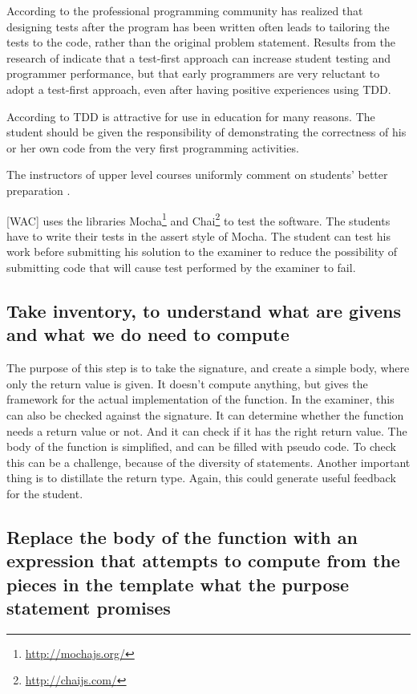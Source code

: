 According to \citep{proulx_test-driven_2009} the professional programming community has realized that designing tests after the program has been written often leads to tailoring the tests to the \gls{code}, rather than the original problem statement.
Results from the research of \citep{janzen_test-driven_2008} indicate that a test-first approach can
increase \gls{student} testing and programmer performance, but that early programmers are very reluctant to
adopt a test-first approach, even after having positive experiences using TDD.

According to \citep{edwards_rethinking_2003} TDD is attractive for use in education for many reasons.
The \gls{student} should be given the responsibility of demonstrating
the correctness of his or her own \gls{code} from the very first programming activities.

The instructors of upper level courses uniformly comment on students' better preparation \citep{proulx_test-driven_2009}.


[WAC] uses the libraries Mocha\footnote{\url{http://mochajs.org/}} and
Chai\footnote{\url{http://chaijs.com/}} to test the software.
The students have to write their tests in the assert style of Mocha. 
The \gls{student} can test his work before submitting his \gls{solution} to the
\gls{examiner} to reduce the possibility of submitting \gls{code} that will cause
test performed by the \gls{examiner} to fail.



\subsection{Take inventory, to understand what are givens and what we do need to compute}

The purpose of this step is to take the signature, and create a simple body,
where only the return value is given.
It doesn't compute anything, but gives the framework for the actual
implementation of the function.
In the \gls{examiner}, this can also be checked against the signature. It
can determine whether the function needs a return value or not. And it can check
if it has the right return value. The body of the function is simplified, and
can be filled with pseudo \gls{code}.
To check this can be a challenge, because of the diversity of statements. Another
important thing is to distillate the return type.
Again, this could generate useful feedback for the \gls{student}.



\subsection{Replace the body of the function with an expression that attempts to compute from the pieces in the template what the purpose statement promises}

